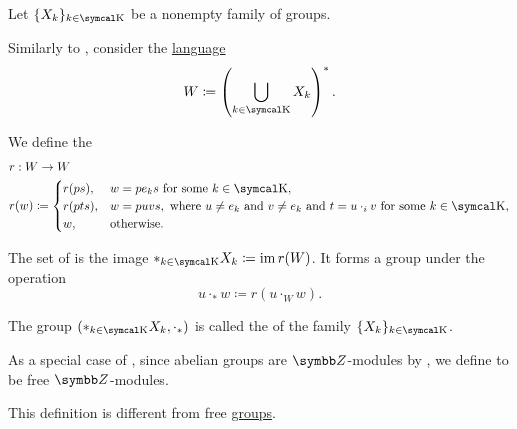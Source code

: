 \begin{definition}\label{def:group_free_product}
  Let \( \{ X_k \}_{k \in \CK} \) be a nonempty family of groups.

  Similarly to , consider the \hyperref[def:language]{language}
  \begin{equation*}
    W \coloneqq \left( \bigcup_{k \in \CK} X_k \right)^{*}.
  \end{equation*}

  We define the 
  \begin{align*}
     & r: W \to W                                \\
     & r(w) \coloneqq \begin{cases}
      r(ps),  & w = p e_k s \text{ for some } k \in \CK,                                                                              \\
      r(pts), & w = puvs, \text{ where } u \neq e_k \text{ and } v \neq e_k \text{ and } t = u \cdot_i v \text{ for some } k \in \CK, \\
      w,      & \text{otherwise}.
    \end{cases}
  \end{align*}

  The set of  is the image \( \ast_{k \in \CK} X_k \coloneqq \Img r(W) \). It forms a group under the operation
  \begin{equation*}
    u \cdot_\ast w \coloneqq r(u \cdot_{W} w).
  \end{equation*}

  The group \( (\ast_{k \in \CK} X_k, \cdot_\ast) \) is called the  of the family \( \{ X_k \}_{k \in \CK} \).
\end{definition}

\begin{definition}\label{def:free_abelian_group}
  As a special case of , since abelian groups are \( \BZ \)-modules by , we define  to be free \( \BZ \)-modules.

  This definition is different from free \hyperref[def:free_group]{groups}.
\end{definition}


